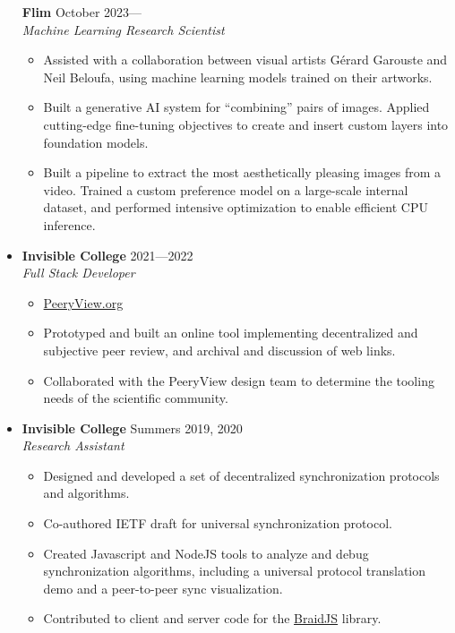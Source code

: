 \documentclass[12pt,letterpaper]{article}
\newenvironment{explist}
{\begin{itemize}[label=\textbf{--},itemsep=1pt,topsep=0pt,partopsep=0pt,parsep=0pt]}
{\end{itemize}}
\begin{document}
\begin{itemize}[label=]
        \textbf{Flim} \hfill October 2023---\\
        \textit{Machine Learning Research Scientist}
        \begin{explist}
        \item Assisted with a collaboration between visual artists G\'erard Garouste and Neil Beloufa, using machine learning models trained on their artworks.
        \item Built a generative AI system for ``combining'' pairs of images.
            Applied cutting-edge fine-tuning objectives to create and insert custom layers into foundation models.
        \item Built a pipeline to extract the most aesthetically pleasing images from a video.
            Trained a custom preference model on a large-scale internal dataset,
            and performed intensive optimization to enable efficient CPU inference.
        \end{explist}

    \item
        \textbf{Invisible College} \hfill 2021---2022\\
        \textit{Full Stack Developer}
        \begin{explist}
        \item \href{https://peeryview.org}{PeeryView.org}
        \item Prototyped and built an online tool implementing decentralized and subjective peer review, and archival and discussion of web links.
        \item Collaborated with the PeeryView design team to determine the tooling needs of the scientific community.
        \end{explist}
    \item
        \textbf{Invisible College} \hfill Summers 2019, 2020\\
        \textit{Research Assistant}
        \begin{explist}
        \item Designed and developed a set of decentralized synchronization protocols and algorithms.
        \item Co-authored IETF draft for universal synchronization protocol.
        \item Created Javascript and NodeJS tools to analyze and debug synchronization algorithms, including a universal protocol translation demo and a peer-to-peer sync visualization.
        \item Contributed to client and server code for the \href{https://github.com/braid-work/braidjs}{BraidJS} library.
        \end{explist}


\end{itemize}
\end{document}
